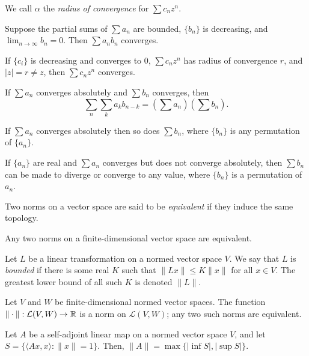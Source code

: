 \begin{defn}
    We call $\alpha$ the \emph{radius of convergence} for $\sum c_n z^n$.
\end{defn}
\begin{prop}
    Suppose the partial sums of $\sum a_n$ are bounded, $\{b_n\}$ is decreasing,
    and $\lim_{n\to\infty} b_n=0$. Then $\sum a_n b_n$ converges.
\end{prop}
\begin{cor}
    If $\{c_i\}$ is decreasing and converges to $0$, $\sum c_n z^n$ has
    radius of convergence $r$, and $|z|=r\ne z$, then $\sum c_n z^n$ converges.
\end{cor}
\begin{prop}
    If $\sum a_n$ converges absolutely and $\sum b_n$ converges, then
    \[\sum_n\sum_k a_k b_{n-k}=\left(\sum a_n\right)\left(\sum b_n\right).\]
\end{prop}
\begin{prop}
    If $\sum a_n$ converges absolutely then so does $\sum b_n$, where $\{b_n\}$
    is any permutation of $\{a_n\}$.
\end{prop}
\begin{prop}
    If $\{a_n\}$ are real and $\sum a_n$ converges but does not converge
    absolutely, then $\sum b_n$
    can be made to diverge or converge to any value, where $\{b_n\}$ is a
    permutation of $a_n$.
\end{prop}
\begin{defn}
    Two norms on a vector space are said to be \emph{equivalent} if they induce
    the same topology.
\end{defn}
\begin{prop}
    Any two norms on a finite-dimensional vector space are equivalent.
\end{prop}
\begin{defn}
  Let $L$ be a linear transformation on a normed vector space $V$. We say that
  $L$ is \emph{bounded} if there is some real $K$ such that $\|Lx\|\le K\|x\|$
  for all $x\in V$. The greatest lower bound of all such $K$ is denoted $\|L\|$.
\end{defn}
\begin{prop}
  Let $V$ and $W$ be finite-dimensional normed vector spaces. The function
  $\|\cdot\|:\mathcal L(V,W)\to\mathbb{R}$ is a norm on $\mathcal L(V,W)$; any two such
  norms are equivalent.
\end{prop}
\begin{prop}
  Let $A$ be a self-adjoint linear map on a normed vector space $V$, and let
  $S=\{\langle Ax,x\rangle:\|x\|=1\}$. Then, $\|A\|=\max\{|\inf S|,|\sup
  S|\}$.
\end{prop}
